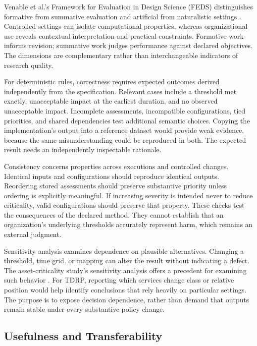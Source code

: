 Venable et al.'s Framework for Evaluation in Design Science (FEDS) distinguishes formative from summative evaluation and artificial from naturalistic settings \cite{venable2016feds}. Controlled settings can isolate computational properties, whereas organizational use reveals contextual interpretation and practical constraints. Formative work informs revision; summative work judges performance against declared objectives. The dimensions are complementary rather than interchangeable indicators of research quality.

For deterministic rules, correctness requires expected outcomes derived independently from the specification. Relevant cases include a threshold met exactly, unacceptable impact at the earliest duration, and no observed unacceptable impact. Incomplete assessments, incompatible configurations, tied priorities, and shared dependencies test additional semantic choices. Copying the implementation's output into a reference dataset would provide weak evidence, because the same misunderstanding could be reproduced in both. The expected result needs an independently inspectable rationale.

Consistency concerns properties across executions and controlled changes. Identical inputs and configurations should reproduce identical outputs. Reordering stored assessments should preserve substantive priority unless ordering is explicitly meaningful. If increasing severity is intended never to reduce criticality, valid configurations should preserve that property. These checks test the consequences of the declared method. They cannot establish that an organization's underlying thresholds accurately represent harm, which remains an external judgment.

Sensitivity analysis examines dependence on plausible alternatives. Changing a threshold, time grid, or mapping can alter the result without indicating a defect. The asset-criticality study's sensitivity analysis offers a precedent for examining such behavior \cite{assetcriticality2023}. For TDRP, reporting which services change class or relative position would help identify conclusions that rely heavily on particular settings. The purpose is to expose decision dependence, rather than demand that outputs remain stable under every substantive policy change.

\subsection{Usefulness and Transferability}
\label{sec:lr_validity}

